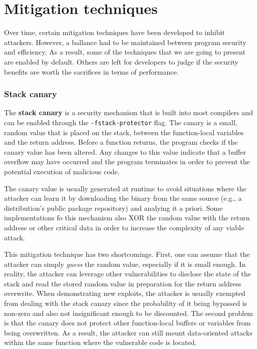 \section{Mitigation techniques}

Over time, certain mitigation techniques have been developed to inhibit
attackers. However, a ballance had to be maintained between program security
and efficiency. As a result, some of the techniques that we are going to
present are enabled by default. Others are left for developers to judge if the
security benefits are worth the sacrifices in terms of performance.

\subsubsection{Stack canary}

The \textbf{stack canary} is a security mechanism that is built into most
compilers and can be enabled through the \texttt{-fstack-protector} flag. The
canary is a small, random value that is placed on the stack, between the
function-local variables and the return address. Before a function returns, the
program checks if the canary value has been altered. Any changes to this value
indicate that a buffer overflow may have occurred and the program terminates
in order to prevent the potential execution of malicious code.

The canary value is usually generated at runtime to avoid situations where the
attacker can learn it by downloading the binary from the same source (e.g., a
distribution's public package repository) and analying it a priori. Some
implementations fo this mechanism also XOR the random value with the return
address or other critical data in order to increase the complexity of any
viable attack.

This mitigation technique has two shortcomings. First, one can assume that the
attacker can simply \textit{guess} the random value, especially if it is small
enough. In reality, the attacker can leverage other vulnerabilities to disclose
the state of the stack and read the stored random value in preparation for the
return address overwrite. When demonstrating new exploits, the attacker is
usually exempted from dealing with the stack canary since the probability of it
being bypassed is non-zero and also not insignificant enough to be discounted.
The second problem is that the canary does not protect other function-local
buffers or variables from being overwritten. As a result, the attacker can
still mount data-oriented attacks within the same function where the
vulnerable code is located.

